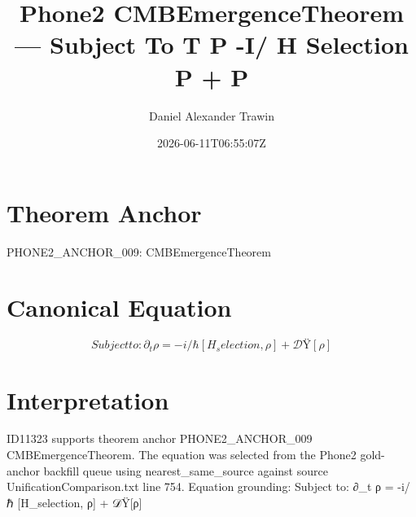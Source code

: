 \documentclass[11pt]{article}
\title{Phone2 CMBEmergenceTheorem — Subject To T Ρ -I/ H Selection Ρ + Ρ}
\author{Daniel Alexander Trawin}
\date{2026-06-11T06:55:07Z}
\begin{document}
\maketitle
\section*{Theorem Anchor}
PHONE2_ANCHOR_009: CMBEmergenceTheorem
\section*{Canonical Equation}
\[
Subject to: ∂_t ρ = -i/ℏ [H_selection, ρ] + 𝒟Ÿ[ρ]
\]
\section*{Interpretation}
ID11323 supports theorem anchor PHONE2_ANCHOR_009 CMBEmergenceTheorem. The equation was selected from the Phone2 gold-anchor backfill queue using nearest_same_source against source UnificationComparison.txt line 754. Equation grounding: Subject to: ∂_t ρ = -i/ℏ [H_selection, ρ] + 𝒟Ÿ[ρ]
\end{document}
